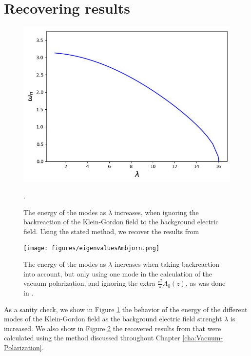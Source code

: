 \section{Recovering results}

\begin{figure}
    \centering
    \includegraphics[width=0.5\linewidth]{figures/eigenvalues-external-field-approximation.png}     
    \caption{The energy of the modes as $\lambda$ increases, when ignoring the backreaction of the Klein-Gordon field to the background electric field. Using the stated method, we recover the results from \cite{Ambjorn1983}}.
    \label{fig:external-field-approximation}
\end{figure}

\begin{figure}
    \centering
    \texttt{[image: figures/eigenvaluesAmbjorn.png]}   
    \caption{The energy of the modes as $\lambda$ increases when taking backreaction into account, but only using one mode in the calculation of the vacuum polarization, and ignoring the extra $\frac{e^2}{\pi} A_0(z)$, as was done in \cite{Ambj1983}. }
    \label{fig:eigenvaluesAmbjorn}
\end{figure}

As a sanity check, we show in Figure \ref{fig:external-field-approximation} the behavior of the energy of the different modes of the Klein-Gordon field as the background electric field strenght $\lambda$ is increased. We also show in Figure \ref{fig:eigenvaluesAmbjorn} the recovered results from \cite{Ambj1983} that were calculated using the method discussed throughout Chapter \ref{cha:Vacuum-Polarization}.

